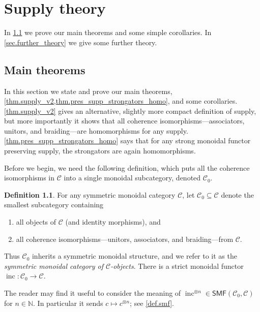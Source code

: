 \documentclass[11pt, oneside, article]{memoir}
\theoremstyle{plain}
\theoremstyle{definition}
\newtheorem{definition}[theorem]{Definition}
\theoremstyle{remark}
\newcommand{\cat}[1]{\mathcal{#1}}%
\newcommand{\Cat}[1]{{\mathsf{#1}}}%
\DeclareMathOperator{\inc}{inc}
\newcommand{\tpow}[1]{^{\otimes #1}}
\newcommand{\smf}{\Cat{SMF}}
\newcommand{\nn}{\mathbb{N}}
\newcommand{\mob}[1]{#1_0}
\renewcommand{\ss}{\subseteq}
\begin{document}
\chapter{Supply theory}

In \cref{sec.main_thm} we prove our main theorems and some simple corollaries. In \cref{sec.further_theory} we give some further theory. 

\section{Main theorems}\label{sec.main_thm}

In this section we state and prove our main theorems, \cref{thm.supply_v2,thm.pres_supp_strongators_homo}, and some corollaries. \cref{thm.supply_v2} gives an alternative, slightly more compact definition of supply, but more importantly it shows that all coherence isomorphisms---associators, unitors, and braiding---are homomorphisms for any supply. \cref{thm.pres_supp_strongators_homo} says that for any strong monoidal functor preserving supply,  the strongators are again homomorphisms.

Before we begin, we need the following definition, which puts all the coherence isomorphisms in $\cat{C}$ into a single monoidal subcategory, denoted $\mob{\cat{C}}$.

\begin{definition}\label{def.mob}
For any symmetric monoidal category $\cat{C}$, let $\mob{\cat{C}}\ss\cat{C}$ denote the smallest subcategory containing
\begin{enumerate}
	\item all objects of $\cat{C}$ (and identity morphisms), and
	\item all coherence isomorphisms---unitors, associators, and braiding---from $\cat{C}$.
\end{enumerate}
Thus $\mob{\cat{C}}$ inherits a symmetric monoidal structure, and we refer to it as the \emph{symmetric monoidal category of $\cat{C}$-objects}. There is a strict monoidal functor $\inc\colon\mob{\cat{C}}\to\cat{C}$. 
\end{definition}

The reader may find it useful to consider the meaning of $\inc\tpow{n}\in\smf(\mob{\cat{C}},\cat{C})$ for $n\in\nn$. In particular it sends $c\mapsto c\tpow{n}$; see \cref{def.smf}.
\end{document}
